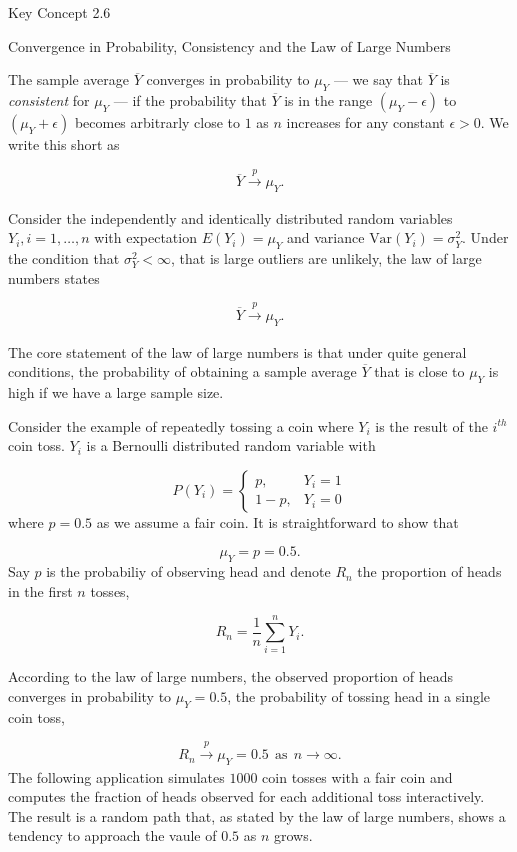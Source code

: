 \documentclass[]{book}
\theoremstyle{definition}
\theoremstyle{definition}
\theoremstyle{definition}
\theoremstyle{remark}
\begin{document}
Key Concept 2.6

Convergence in Probability, Consistency and the Law of Large Numbers

The sample average \(\overline{Y}\) converges in probability to
\(\mu_Y\) --- we say that \(\overline{Y}\) is \emph{consistent} for
\(\mu_Y\) --- if the probability that \(\overline{Y}\) is in the range
\((\mu_Y - \epsilon)\) to \((\mu_Y + \epsilon)\) becomes arbitrarly
close to \(1\) as \(n\) increases for any constant \(\epsilon > 0\). We
write this short as

\[ \overline{Y} \xrightarrow[]{p} \mu_Y. \]

Consider the independently and identically distributed random variables
\(Y_i, i=1,\dots,n\) with expectation \(E(Y_i)=\mu_Y\) and variance
\(\text{Var}(Y_i)=\sigma^2_Y\). Under the condition that
\(\sigma^2_Y< \infty\), that is large outliers are unlikely, the law of
large numbers states

\[ \overline{Y} \xrightarrow[]{p} \mu_Y. \]

The core statement of the law of large numbers is that under quite
general conditions, the probability of obtaining a sample average
\(\overline{Y}\) that is close to \(\mu_Y\) is high if we have a large
sample size.

Consider the example of repeatedly tossing a coin where \(Y_i\) is the
result of the \(i^{th}\) coin toss. \(Y_i\) is a Bernoulli distributed
random variable with

\[ P(Y_i) = \begin{cases} p, & Y_i = 1 \\ 1-p, & Y_i = 0 \end{cases} \]
where \(p = 0.5\) as we assume a fair coin. It is straightforward to
show that

\[ \mu_Y = p = 0.5. \] Say \(p\) is the probabiliy of observing head and
denote \(R_n\) the proportion of heads in the first \(n\) tosses,

\[ R_n = \frac{1}{n} \sum_{i=1}^n Y_i. \tag{2.5}\]

According to the law of large numbers, the observed proportion of heads
converges in probability to \(\mu_Y = 0.5\), the probability of tossing
head in a single coin toss,

\[ R_n \xrightarrow[]{p} \mu_Y=0.5 \ \ \text{as} \ \ n \rightarrow \infty.  \]
The following application simulates \(1000\) coin tosses with a fair
coin and computes the fraction of heads observed for each additional
toss interactively. The result is a random path that, as stated by the
law of large numbers, shows a tendency to approach the vaule of \(0.5\)
as \(n\) grows.
\end{document}
